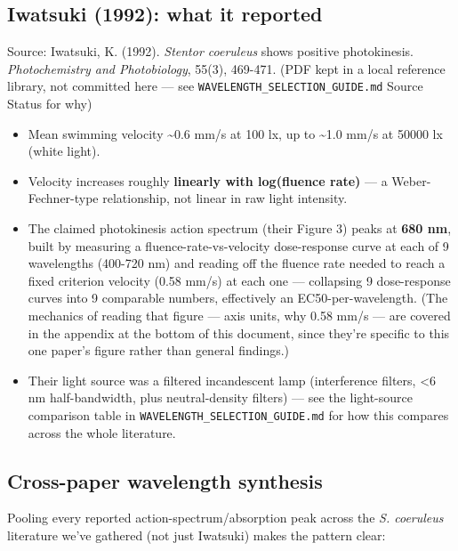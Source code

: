 \documentclass[
]{article}
\providecommand{\tightlist}{%
  \setlength{\itemsep}{0pt}\setlength{\parskip}{0pt}}
\begin{document}
\hypertarget{iwatsuki-1992-what-it-reported}{%
\subsection{Iwatsuki (1992): what it
reported}\label{iwatsuki-1992-what-it-reported}}

Source: Iwatsuki, K. (1992). \emph{Stentor coeruleus} shows positive
photokinesis. \emph{Photochemistry and Photobiology}, 55(3), 469-471.
(PDF kept in a local reference library, not committed here --- see
\texttt{WAVELENGTH\_SELECTION\_GUIDE.md} Source Status for why)

\begin{itemize}
\tightlist
\item
  Mean swimming velocity \textasciitilde0.6 mm/s at 100 lx, up to
  \textasciitilde1.0 mm/s at 50000 lx (white light).
\item
  Velocity increases roughly \textbf{linearly with log(fluence rate)}
  --- a Weber-Fechner-type relationship, not linear in raw light
  intensity.
\item
  The claimed photokinesis action spectrum (their Figure 3) peaks at
  \textbf{680 nm}, built by measuring a fluence-rate-vs-velocity
  dose-response curve at each of 9 wavelengths (400-720 nm) and reading
  off the fluence rate needed to reach a fixed criterion velocity (0.58
  mm/s) at each one --- collapsing 9 dose-response curves into 9
  comparable numbers, effectively an EC50-per-wavelength. (The mechanics
  of reading that figure --- axis units, why 0.58 mm/s --- are covered
  in the appendix at the bottom of this document, since they're specific
  to this one paper's figure rather than general findings.)
\item
  Their light source was a filtered incandescent lamp (interference
  filters, \textless6 nm half-bandwidth, plus neutral-density filters)
  --- see the light-source comparison table in
  \texttt{WAVELENGTH\_SELECTION\_GUIDE.md} for how this compares across
  the whole literature.
\end{itemize}

\hypertarget{cross-paper-wavelength-synthesis}{%
\subsection{Cross-paper wavelength
synthesis}\label{cross-paper-wavelength-synthesis}}

Pooling every reported action-spectrum/absorption peak across the
\emph{S. coeruleus} literature we've gathered (not just Iwatsuki) makes
the pattern clear:
\end{document}

